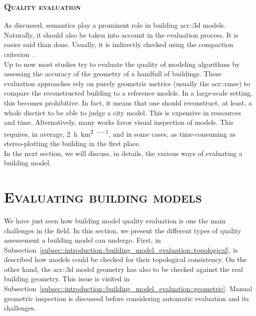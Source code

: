         \subsubsection{\textsc{Quality evaluation}}
            As discussed, semantics play a prominent role in building \gls{acr::3d} models.
            Naturally, it should also be taken into account in the evaluation process.
            It is easier said than done.
            Usually, it is indirectly checked using the compaction criterion~\parencite{lafarge2012creating}.\\
            Up to now most studies try to evaluate the quality of modeling algorithms by assessing the accuracy of the geometry of a handfull of buildings.
            These evaluation approaches rely on purely geometric metrics (usually the \gls{acr::rmse}) to compare the reconstructed building to a reference models.
            In a large-scale setting, this becomes prohibitive.
            In fact, it means that one should reconstruct, at least, a whole disctict to be able to judge a city model.
            This is expensive in ressources and time.
            Alternatively, many works favor visual inspection of models.
            This requires, in average, \SI[per-mode=repeated-symbol]{2}{\hour\per\km\squared\per\expert}, and in some cases, as time-consuming  as stereo-plotting the building in the first place.\\
            In the next section, we will discuss, in details, the various ways of evaluating a building model.

\section{\textsc{Evaluating building models}}
    \label{sec::introduction::building_model_evaluation}
    We have just seen how building model quality evaluation is one the main challenges in the field.
    In this section, we present the different types of quality assessement a building model can undergo.
    First, in Subsection~\ref{subsec::introduction::building_model_evaluation::topological}, is described how models could be checked for their topological consistency.
    On the other hand, the \gls{acr::3d} model geometry has also to be checked against the real building geometry.
    This issue is visited in Subsection~\ref{subsec::introduction::building_model_evaluation::geometric}.
    Manual geometric inspection is discussed before considering automatic evaluation and its challenges.

